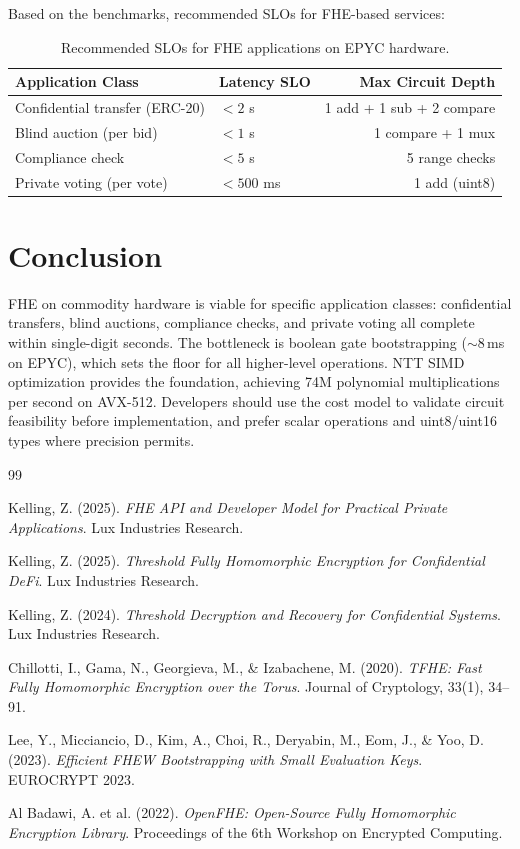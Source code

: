\documentclass[11pt]{article}
\begin{document}
Based on the benchmarks, recommended SLOs for FHE-based services:

\begin{table}[h]
\centering
\begin{tabular}{@{}llr@{}}
\toprule
\textbf{Application Class} & \textbf{Latency SLO} & \textbf{Max Circuit Depth} \\
\midrule
Confidential transfer (ERC-20) & $< 2$ s & 1 add + 1 sub + 2 compare \\
Blind auction (per bid) & $< 1$ s & 1 compare + 1 mux \\
Compliance check & $< 5$ s & 5 range checks \\
Private voting (per vote) & $< 500$ ms & 1 add (uint8) \\
\bottomrule
\end{tabular}
\caption{Recommended SLOs for FHE applications on EPYC hardware.}
\label{tab:slos}
\end{table}

\section{Conclusion}

FHE on commodity hardware is viable for specific application classes: confidential transfers, blind auctions, compliance checks, and private voting all complete within single-digit seconds. The bottleneck is boolean gate bootstrapping ($\sim$8\,ms on EPYC), which sets the floor for all higher-level operations. NTT SIMD optimization provides the foundation, achieving 74M polynomial multiplications per second on AVX-512. Developers should use the cost model to validate circuit feasibility before implementation, and prefer scalar operations and uint8/uint16 types where precision permits.

\begin{thebibliography}{99}

Kelling, Z. (2025).
\textit{FHE API and Developer Model for Practical Private Applications}.
Lux Industries Research.

Kelling, Z. (2025).
\textit{Threshold Fully Homomorphic Encryption for Confidential DeFi}.
Lux Industries Research.

Kelling, Z. (2024).
\textit{Threshold Decryption and Recovery for Confidential Systems}.
Lux Industries Research.

Chillotti, I., Gama, N., Georgieva, M., \& Izabachene, M. (2020).
\textit{TFHE: Fast Fully Homomorphic Encryption over the Torus}.
Journal of Cryptology, 33(1), 34--91.

Lee, Y., Micciancio, D., Kim, A., Choi, R., Deryabin, M., Eom, J., \& Yoo, D. (2023).
\textit{Efficient FHEW Bootstrapping with Small Evaluation Keys}.
EUROCRYPT 2023.

Al Badawi, A. et al. (2022).
\textit{OpenFHE: Open-Source Fully Homomorphic Encryption Library}.
Proceedings of the 6th Workshop on Encrypted Computing.

\end{thebibliography}
\end{document}
